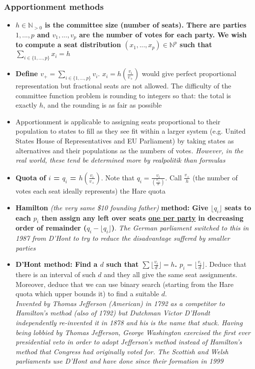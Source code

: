 \documentclass[20pt,a4paper,landscape]{extarticle}
\begin{document}
\begin{flushleft}
\subsubsection{Apportionment methods}
\begin{itemize}
\item \textbf{$h \in \mathbb{N}_{>0}$ is the committee size (number of seats). There are parties $1, ..., p$ and $v_1, ..., v_p$ are the number of votes for each party. We wish to compute a seat distribution $(x_1, ..., x_p) \in \mathbb{N}^p$ such that $\sum_{i \in \{1, ..., p\}} x_i = h$}\\
\item \textbf{Define $v_+ = \sum_{i \in \{1, ..., p\}} v_i$}. $x_i = h\left(\frac{v_i}{v_+}\right)$ would give perfect proportional representation but fractional seats are not allowed. The difficulty of the committee function problem is rounding to integers so that: the total is exactly $h$, and the rounding is as fair as possible
\item Apportionment is applicable to assigning seats proportional to their population to states to fill as they see fit within a larger system (e.g. United States House of Representatives and EU Parliament) by taking states as alternatives and their populations as the numbers of votes\textit{. However, in the real world, these tend be determined more by realpolitik than formulas}
\item \textbf{Quota of $i$ = $q_i$ = $h\left(\frac{v_i}{v_+}\right)$}. Note that $q_i = \frac{v_i}{\left(\frac{v_+}{h}\right)}$. Call $\frac{v_+}{h}$ (the number of votes each seat ideally represents) the Hare quota
\item \textbf{Hamilton} \textit{(the very same \$10 founding father)} \textbf{method: Give $\lfloor q_i \rfloor$ seats to each $p_i$ then assign any left over seats \underline{one per party} in decreasing order of remainder ($q_i - \lfloor q_i \rfloor$)}. \textit{The German parliament switched to this in 1987 from D'Hont to try to reduce the disadvantage suffered by smaller parties}
\item \textbf{D'Hont method: Find a $d$ such that $\sum \lfloor \frac{v_i}{d} \rfloor = h$. $p_i = \lfloor \frac{v_i}{d} \rfloor$}. Deduce that there is an interval of such $d$ and they all give the same seat assignments. Moreover, deduce that we can use binary search (starting from the Hare quota which upper bounds it) to find a suitable $d$.\\
\textit{Invented by Thomas Jefferson (American) in 1792 as a competitor to Hamilton's method (also of 1792) but Dutchman Victor D'Hondt independently re-invented it in 1878 and his is the name that stuck. Having being lobbied by Thomas Jefferson, George Washington exercised the first ever presidential veto in order to adopt Jefferson's method instead of Hamilton's method that Congress had originally voted for. The Scottish and Welsh parliaments use D'Hont and have done since their formation in 1999}

\end{itemize}
\end{flushleft}
\end{document}
